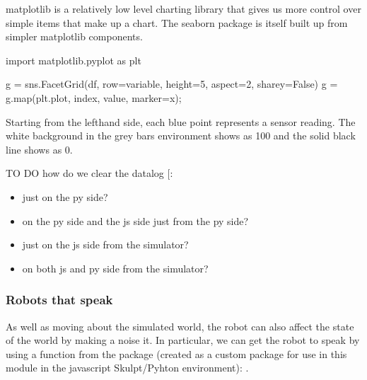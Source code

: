 \documentclass[letterpaper,10pt,english]{sphinxmanual}
\begin{document}
matplotlib is a relatively low level charting library that gives us more control over simple items that make up a chart. The seaborn package is itself built up from simpler matplotlib components.



{
\begin{sphinxVerbatim}[commandchars=\\\{\}]
\llap{\color{nbsphinxin}[ ]:\,\hspace{\fboxrule}\hspace{\fboxsep}}import matplotlib.pyplot as plt

g = sns.FacetGrid(df, row=\PYGZdq{}variable\PYGZdq{}, height=5, aspect=2, sharey=False)
g = g.map(plt.plot, \PYGZdq{}index\PYGZdq{}, \PYGZdq{}value\PYGZdq{}, marker=\PYGZdq{}x\PYGZdq{});
\end{sphinxVerbatim}
}

Starting from the left\sphinxhyphen{}hand side, each blue  point represents a sensor reading. The white background in the grey bars environment shows as 100 and the solid black line shows as 0.

TO DO \sphinxhyphen{} how do we clear the datalog {[}\sphinxhref{https://github.com/innovationOUtside/nbev3devsim/issues/7}{related issue}{]}:
\begin{itemize}
\item {} 
just on the py side?

\item {} 
on the py side and the js side just from the py side?

\item {} 
just on the js side from the simulator?

\item {} 
on both js and py side from the simulator?

\end{itemize}


\subsubsection{Robots that speak}
\label{\detokenize{content/00_SOFTWARE_GUIDE/Section_00_03_quick_practical_tour:Robots-that-speak}}
As well as moving about the simulated world, the robot can also affect the state of the world by making a noise it. In particular, we can get the robot to speak by using a function from the  package (created as a custom package for use in this module in the javascript Skulpt/Pyhton environment): .
\end{document}
